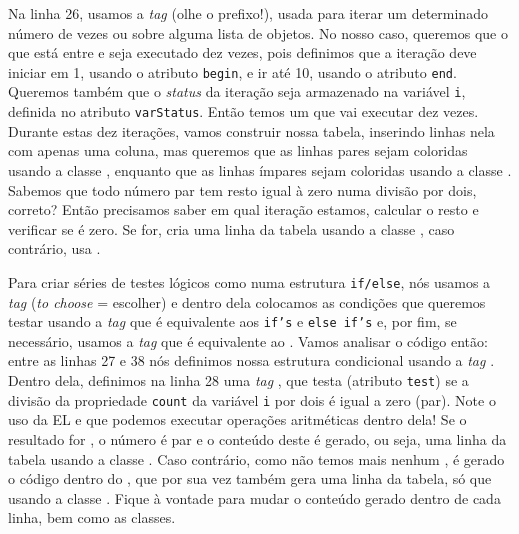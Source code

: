 Na linha 26, usamos a \textit{tag}  (olhe o prefixo!), usada para iterar um determinado número de vezes ou sobre alguma lista de objetos. No nosso caso, queremos que o que está entre  e  seja executado dez vezes, pois definimos que a iteração deve iniciar em 1, usando o atributo \texttt{begin}, e ir até 10, usando o atributo \texttt{end}. Queremos também que o \textit{status} da iteração seja armazenado na variável \texttt{i}, definida no atributo \texttt{varStatus}. Então temos um  que vai executar dez vezes. Durante estas dez iterações, vamos construir nossa tabela, inserindo linhas nela com apenas uma coluna, mas queremos que as linhas pares sejam coloridas usando a classe , enquanto que as linhas ímpares sejam coloridas usando a classe . Sabemos que todo número par tem resto igual à zero numa divisão por dois, correto? Então precisamos saber em qual iteração estamos, calcular o resto e verificar se é zero. Se for, cria uma linha da tabela usando a classe , caso contrário, usa .

Para criar séries de testes lógicos como numa estrutura \texttt{if/else}, nós usamos a \textit{tag}  (\textit{to choose} = escolher) e dentro dela colocamos as condições que queremos testar usando a \textit{tag}  que é equivalente aos \texttt{if’s} e \texttt{else if’s} e, por fim, se necessário, usamos a \textit{tag}  que é equivalente ao . Vamos analisar o código então: entre as linhas 27 e 38 nós definimos nossa estrutura condicional usando a \textit{tag} . Dentro dela, definimos na linha 28 uma \textit{tag} , que testa (atributo \texttt{test}) se a divisão da propriedade \texttt{count} da variável \texttt{i} por dois é igual a zero (par). Note o uso da EL e que podemos executar operações aritméticas dentro dela! Se o resultado for , o número é par e o conteúdo deste  é gerado, ou seja, uma linha da tabela usando a classe . Caso contrário, como não temos mais nenhum , é gerado o código dentro do , que por sua vez também gera uma linha da tabela, só que usando a classe . Fique à vontade para mudar o conteúdo gerado dentro de cada linha, bem como as classes.

